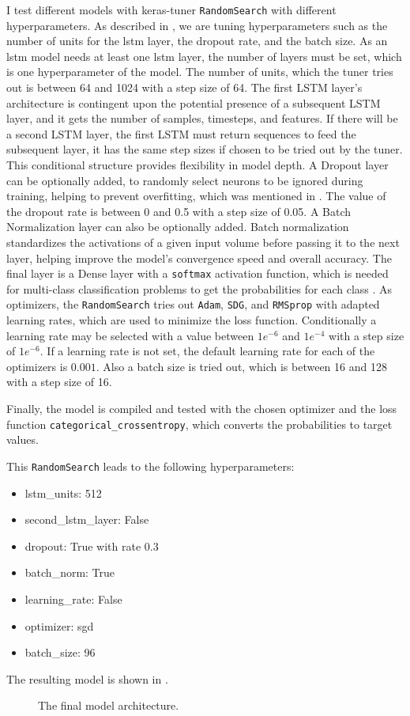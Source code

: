 I test different models with keras-tuner \texttt{RandomSearch} with different hyperparameters.
As described in , we are tuning hyperparameters such as the number of units for the \ac{lstm} layer, the dropout rate, and the batch size.
As an \ac{lstm} model needs at least one \ac{lstm} layer, the number of layers must be set, which is one hyperparameter of the model.
The number of units, which the tuner tries out is between 64 and 1024 with a step size of 64.
The first LSTM layer's architecture is contingent upon the potential presence of a subsequent LSTM layer, and it gets the number of samples, timesteps, and features.
If there will be a second LSTM layer, the first LSTM must return sequences to feed the subsequent layer, it has the same step sizes if chosen to be tried out by the tuner.
This conditional structure provides flexibility in model depth.
A Dropout layer can be optionally added, to randomly select neurons to be ignored during training, helping to prevent overfitting, which was mentioned in .
The value of the dropout rate is between 0 and 0.5 with a step size of 0.05.
A Batch Normalization layer can also be optionally added.
Batch normalization standardizes the activations of a given input volume before passing it to the next layer, helping improve the model's convergence speed and overall accuracy.
The final layer is a Dense layer with a \texttt{softmax} activation function, which is needed for multi-class classification problems to get the probabilities for each class \cite{cat_cross_entropy}.
As optimizers, the \texttt{RandomSearch} tries out \texttt{Adam}, \texttt{SDG}, and \texttt{RMSprop} with adapted learning rates, which are used to minimize the loss function.
Conditionally a learning rate may be selected with a value between \(1e^{-6}\) and \(1e^{-4}\) with a step size of \(1e^{-6}\).
If a learning rate is not set, the default learning rate for each of the optimizers is \(0.001\).
Also a batch size is tried out, which is between 16 and 128 with a step size of 16.

Finally, the model is compiled and tested with the chosen optimizer and the loss function \texttt{categorical\_crossentropy}, which converts the probabilities to target values.

This \texttt{RandomSearch} leads to the following hyperparameters:
\begin{itemize}
    \item lstm\_units: 512
    \item second\_lstm\_layer: False
    \item dropout: True with rate 0.3
    \item batch\_norm: True
    \item learning\_rate: False
    \item optimizer: sgd
    \item batch\_size: 96
\end{itemize}

The resulting model is shown in .
\begin{figure}[h!]
    \centering
    
    \caption{The final model architecture.}
    \label{final_model}
\end{figure}

